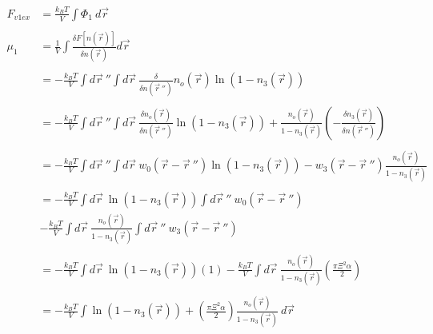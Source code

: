 \documentclass[double,12pt]{beavtex}
\begin{document}
\begin{align}
    F_{v1ex} &= \frac{k_BT}{V}\int \Phi_1~d\vec r \\ \nonumber\\
    \mu_1 &= \frac{1}{V}\int \frac{\delta F[n(\vec r)]}{\delta n(\vec r)} d\vec r \\ \nonumber\\
%
        &= -\frac{k_BT}{V} \int d\vec r~'' \int d\vec r~ \frac{\delta}
        {\delta n(\vec r~'')}n_o(\vec r)\ln(1-n_3(\vec r)) \\ \nonumber\\
%
        &= -\frac{k_BT}{V}\int d\vec r~''\int d\vec r~\frac{\delta n_o(\vec r)}
        {\delta n(\vec r~'')}\ln(1-n_3(\vec r))+\frac{n_o(\vec r)}
          {1-n_3(\vec r)}\left(-\frac{\delta n_3(\vec r)}{\delta n(\vec r~'')}
          \right) \\ \nonumber\\
%
        &= -\frac{k_BT}{V} \int d\vec r~'' \int d\vec r~w_0(\vec r - \vec r~'')
          \ln(1-n_3(\vec r)) - w_3(\vec r - \vec r~'')\frac{n_o(\vec r)}
          {1-n_3(\vec r)} \\ \nonumber\\
%
        &= -\frac{k_BT}{V} \int d\vec r~\ln(1-n_3(\vec r)) \int d \vec r~''  
          ~w_0(\vec r - \vec r~'') \nonumber\\
        &- \frac{k_BT}{V} \int d\vec r ~\frac{n_o(\vec r)}{1-n_3(\vec r)} 
          \int d \vec r~''~w_3(\vec r - \vec r~'')  \\ \\
%
        &= -\frac{k_BT}{V} \int d\vec r ~\ln(1-n_3(\vec r))(1)
          - \frac{k_BT}{V} \int d\vec r ~\frac{n_o(\vec r)}{1-n_3(\vec r)}
          \left(\frac{\pi\Xi^2\alpha}{2}\right) \\ \\
%
        &= -\frac{k_BT}{V}\int\ln(1-n_3(\vec r))+\left(
        \frac{\pi\Xi^2\alpha}{2}\right)\frac{n_o(\vec r)}{1-n_3(\vec r)}~d\vec r
\end{align}
\end{document}
